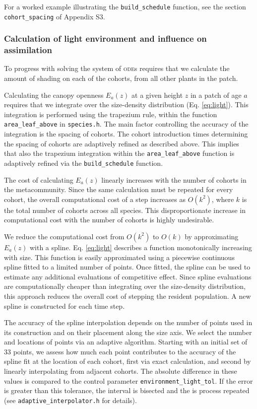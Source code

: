 \documentclass[10pt,twoside]{article}
\begin{document}
For a worked example illustrating the \texttt{build\_schedule} function,
see the section \texttt{cohort\_spacing} of Appendix S3.

\subsubsection{Calculation of light environment and influence on
assimilation}\label{calculation-of-light-environment-and-influence-on-assimilation}

To progress with solving the system of \textsc{ode}s requires that we calculate the amount of
shading on each of the cohorts, from all other plants in the
patch.

Calculating the canopy openness \(E_a(z)\) at a given height \(z\) in a patch of age \(a\) requires that
we integrate over the size-density distribution (Eq. \ref{eq:light}). This
integration is performed using the trapezium rule, within the function
\texttt{area\_leaf\_above} in \texttt{species.h}. The main factor
controlling the accuracy of the integration is the spacing of cohorts.
The cohort introduction times determining the
spacing of cohorts are adaptively refined as described above. This implies that also the trapezium integration
within the \texttt{area\_leaf\_above} function is adaptively refined
via the \texttt{build\_schedule} function.

The cost of calculating \(E_a(z)\) linearly increases with the number of
cohorts in the metacommunity. Since the same calculation must be repeated
for every cohort, the overall computational cost
of a step increases as \(O(k^2 )\), where \(k\) is the
total number of cohorts across all species. This disproportionate
increase in computational cost with the number of cohorts is highly undesirable.

We reduce the computational cost
from \(O(k^2)\) to \(O(k)\) by approximating \(E_a(z)\) with a
spline. Eq. \ref{eq:light} describes a function monotonically
increasing with size. This function is easily
approximated using a piecewise continuous spline fitted to a limited
number of points. Once fitted, the spline can be used to estimate any
additional evaluations of competitive effect. Since spline
evaluations are computationally cheaper than integrating over the size-density distribution,
this approach reduces the overall cost of stepping the resident
population. A new spline is constructed for each time step.

The accuracy of the spline interpolation depends on the number of points
used in its construction and on their placement along the size axis. We
select the number and locations of points via an adaptive algorithm.
Starting with an initial set of 33 points, we assess how much each point
contributes to the accuracy of the spline fit at the location of each
cohort, first via exact calculation, and second by linearly interpolating
from adjacent cohorts. The absolute difference in these values is
compared to the control parameter \texttt{environment\_light\_tol}. If
the error is greater than this tolerance, the interval is bisected and the is
process repeated (see
\texttt{adaptive\_interpolator.h} for details).
\end{document}

